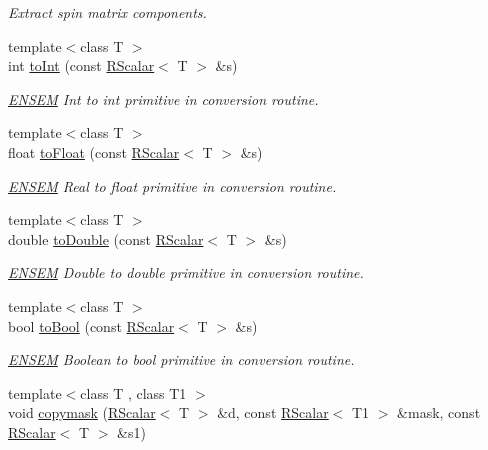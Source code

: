 \begin{DoxyCompactItemize}
\begin{DoxyCompactList}\small\item\em Extract spin matrix components. \end{DoxyCompactList}\item 
{\footnotesize template$<$class T $>$ }\\int \mbox{\hyperlink{group__rscalar_ga7507e0e1da7cf75743141d70fd7150c8}{to\+Int}} (const \mbox{\hyperlink{classENSEM_1_1RScalar}{R\+Scalar}}$<$ T $>$ \&s)
\begin{DoxyCompactList}\small\item\em \mbox{\hyperlink{namespaceENSEM}{E\+N\+S\+EM}} Int to int primitive in conversion routine. \end{DoxyCompactList}\item 
{\footnotesize template$<$class T $>$ }\\float \mbox{\hyperlink{group__rscalar_gad6e25c9e461f462a45e20d34e29165c9}{to\+Float}} (const \mbox{\hyperlink{classENSEM_1_1RScalar}{R\+Scalar}}$<$ T $>$ \&s)
\begin{DoxyCompactList}\small\item\em \mbox{\hyperlink{namespaceENSEM}{E\+N\+S\+EM}} Real to float primitive in conversion routine. \end{DoxyCompactList}\item 
{\footnotesize template$<$class T $>$ }\\double \mbox{\hyperlink{group__rscalar_gadb0411ad1a014fd37c36439881c1e2dc}{to\+Double}} (const \mbox{\hyperlink{classENSEM_1_1RScalar}{R\+Scalar}}$<$ T $>$ \&s)
\begin{DoxyCompactList}\small\item\em \mbox{\hyperlink{namespaceENSEM}{E\+N\+S\+EM}} Double to double primitive in conversion routine. \end{DoxyCompactList}\item 
{\footnotesize template$<$class T $>$ }\\bool \mbox{\hyperlink{group__rscalar_ga84465303bb9b882734bb3c44dff8d024}{to\+Bool}} (const \mbox{\hyperlink{classENSEM_1_1RScalar}{R\+Scalar}}$<$ T $>$ \&s)
\begin{DoxyCompactList}\small\item\em \mbox{\hyperlink{namespaceENSEM}{E\+N\+S\+EM}} Boolean to bool primitive in conversion routine. \end{DoxyCompactList}\item 
{\footnotesize template$<$class T , class T1 $>$ }\\void \mbox{\hyperlink{group__rscalar_ga2bfebcfc9a340228eb6b4449967f1fa0}{copymask}} (\mbox{\hyperlink{classENSEM_1_1RScalar}{R\+Scalar}}$<$ T $>$ \&d, const \mbox{\hyperlink{classENSEM_1_1RScalar}{R\+Scalar}}$<$ T1 $>$ \&mask, const \mbox{\hyperlink{classENSEM_1_1RScalar}{R\+Scalar}}$<$ T $>$ \&s1)

\end{DoxyCompactItemize}
